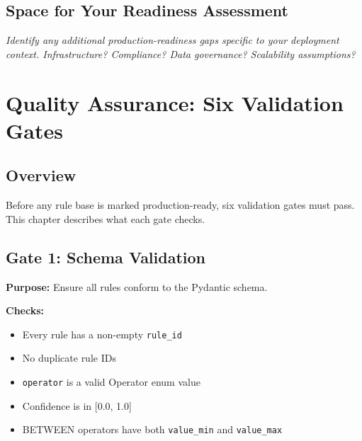 \documentclass[11pt,a4paper]{report}
\newcommand{\inlinecode}[1]{\texttt{\color{secondary}#1}}
\newenvironment{notebox}{%
  \begin{callout}%
}{%
  \end{callout}%
}
\begin{document}
\section{Space for Your Readiness Assessment}

\begin{notebox}
\Large\vspace{3cm}

\noindent\textcolor{dark}{\emph{Identify any additional production-readiness gaps specific to your deployment context. Infrastructure? Compliance? Data governance? Scalability assumptions?}}

\vspace{3cm}
\end{notebox}

\chapter{Quality Assurance: Six Validation Gates}

\section{Overview}

Before any rule base is marked production-ready, six validation gates must pass. This chapter describes what each gate checks.

\section{Gate 1: Schema Validation}

\textbf{Purpose:} Ensure all rules conform to the Pydantic schema.

\textbf{Checks:}
\begin{itemize}
  \item Every rule has a non-empty \inlinecode{rule\_id}
  \item No duplicate rule IDs
  \item \inlinecode{operator} is a valid Operator enum value
  \item Confidence is in [0.0, 1.0]
  \item BETWEEN operators have both \inlinecode{value\_min} and \inlinecode{value\_max}
\end{itemize}
\end{document}
